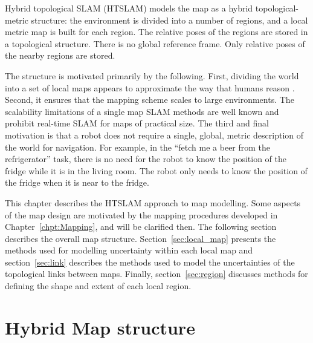 Hybrid topological SLAM (HTSLAM) models the map as a hybrid
topological-metric structure: the environment is divided into a number
of regions, and a local metric map is built for each region. The
relative poses of the regions are stored in a topological
structure. There is no global reference frame. Only relative poses of
the nearby regions are stored.


The structure is motivated primarily by the following.  First,
dividing the world into a set of local maps appears to approximate the
way that humans reason \cite{psycho_kuipers82}. Second, it ensures
that the mapping scheme scales to large environments.  The scalability
limitations of a single map SLAM methods are well known
\cite{guivant04,guivant01,guivant02} and prohibit real-time SLAM for
maps of practical size.  The third and final motivation is that a
robot does not require a single, global, metric description of the
world for navigation. For example, in the ``fetch me a beer from the
refrigerator'' task, there is no need for the robot to know the
position of the fridge while it is in the living room.  The robot only
needs to know the position of the fridge when it is near to the
fridge.

This chapter describes the HTSLAM approach to map modelling.  Some
aspects of the map design are motivated by the mapping procedures
developed in Chapter~\ref{chpt:Mapping}, and will be clarified then.
The following section describes the overall map structure.
Section~\ref{sec:local_map} presents the methods used for modelling
uncertainty within each local map and section~\ref{sec:link} describes
the methods used to model the uncertainties of the topological links
between maps.  Finally, section~\ref{sec:region} discusses methods for
defining the shape and extent of each local region.

\section{Hybrid Map structure}
\label{sec:HM_structure}


